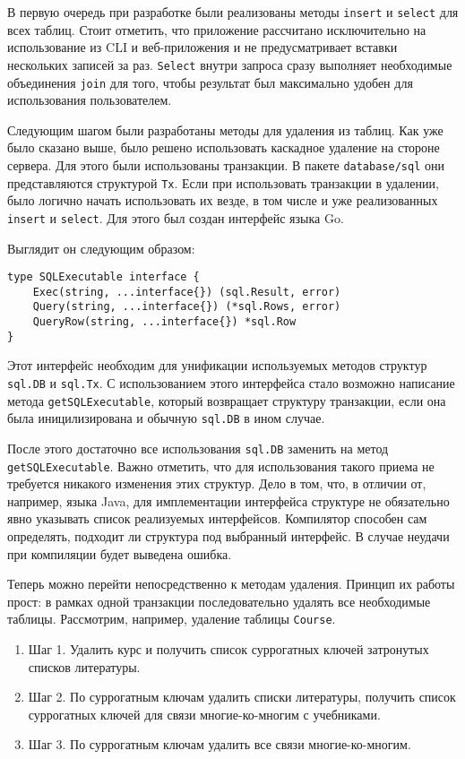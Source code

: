 В первую очередь при разработке были реализованы методы \texttt{insert} и \texttt{select} для всех таблиц.
Стоит отметить, что приложение рассчитано исключительно на использование из CLI и веб-приложения и не
предусматривает вставки нескольких записей за раз. \texttt{Select} внутри запроса сразу выполняет
необходимые объединения \texttt{join} для того, чтобы результат был максимально удобен для
использования пользователем.

Следующим шагом были разработаны методы для удаления из таблиц. Как уже было сказано выше,
было решено использовать каскадное удаление на стороне сервера. Для этого были использованы
транзакции. В пакете \texttt{database/sql} они представляются структурой \texttt{Tx}.
Если при использовать транзакции в удалении, было логично начать использовать их везде, в том числе
и уже реализованных \texttt{insert} и \texttt{select}. Для этого был создан интерфейс языка Go.

Выглядит он следующим образом:

\begin{lstlisting}
type SQLExecutable interface {
	Exec(string, ...interface{}) (sql.Result, error)
	Query(string, ...interface{}) (*sql.Rows, error)
	QueryRow(string, ...interface{}) *sql.Row
}
\end{lstlisting}

Этот интерфейс необходим для унификации используемых методов структур \texttt{sql.DB} и \texttt{sql.Tx}.
С использованием этого интерфейса стало возможно написание метода \texttt{getSQLExecutable}, который
возвращает структуру транзакции, если она была иницилизирована и обычную \texttt{sql.DB} в ином случае.

После этого достаточно все использования \texttt{sql.DB} заменить на метод \texttt{getSQLExecutable}.
Важно отметить, что для использования такого приема не требуется никакого изменения этих структур.
Дело в том, что, в отличии от, например, языка Java, для имплементации интерфейса структуре не
обязательно явно указывать список реализуемых интерфейсов. Компилятор способен сам определять, подходит
ли структура под выбранный интерфейс. В случае неудачи при компиляции будет выведена ошибка.

Теперь можно перейти непосредственно к методам удаления. Принцип их работы прост: в рамках одной
транзакции последовательно удалять все необходимые таблицы. Рассмотрим, например, удаление
таблицы \texttt{Course}.

\begin{enumerate}
    \item Шаг 1. Удалить курс и получить список суррогатных ключей затронутых списков литературы.
    \item Шаг 2. По суррогатным ключам удалить списки литературы, получить список суррогатных ключей
    для связи многие-ко-многим с учебниками.
    \item Шаг 3. По суррогатным ключам удалить все связи многие-ко-многим.
\end{enumerate}

